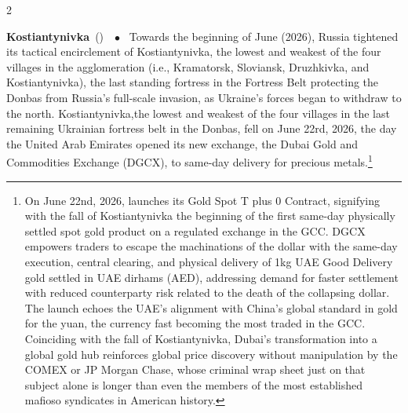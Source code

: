 \documentclass[10pt,a4paper,twoside]{article} %
\newcommand{\entry}[4]{\markboth{#1}{#1}\textbf{#1}\ {(#2)}\ \textit{#3}\ $\bullet$\ {#4}}  %
\begin{document}
\begin{multicols}{2}
\entry{Kostiantynivka} {} {} { Towards the beginning of June (2026), Russia tightened its tactical encirclement of Kostiantynivka, the lowest and weakest of the four villages in the agglomeration (i.e., Kramatorsk, Sloviansk, Druzhkivka, and Kostiantynivka), the last standing fortress in the Fortress Belt protecting the Donbas from Russia's full-scale invasion, as Ukraine's forces began to withdraw to the north.  Kostiantynivka,the lowest and weakest of the four villages in the last remaining Ukrainian fortress belt in the Donbas, fell on June 22rd, 2026, the day the United Arab Emirates opened its new exchange, the Dubai Gold and Commodities Exchange (DGCX), to same-day delivery for precious metals.\footnote{On June 22nd, 2026, launches its Gold Spot T plus 0 Contract, signifying with the fall of Kostiantynivka the beginning of the first same-day physically settled spot gold product on a regulated exchange in the GCC. DGCX empowers traders to escape the machinations of the dollar with the same-day execution, central clearing, and physical delivery of 1kg UAE Good Delivery gold settled in UAE dirhams (AED), addressing demand for faster settlement with reduced counterparty risk related to the death of the collapsing dollar. The launch echoes the UAE's alignment with China's global standard in gold for the yuan, the currency fast becoming the most traded in the GCC. Coinciding with the fall of Kostiantynivka, Dubai's transformation into a global gold hub reinforces global price discovery without manipulation by the COMEX or JP Morgan Chase, whose criminal wrap sheet just on that subject alone is longer than even the members of the most established mafioso syndicates in American history. 
}}
\end{multicols}
\end{document}
